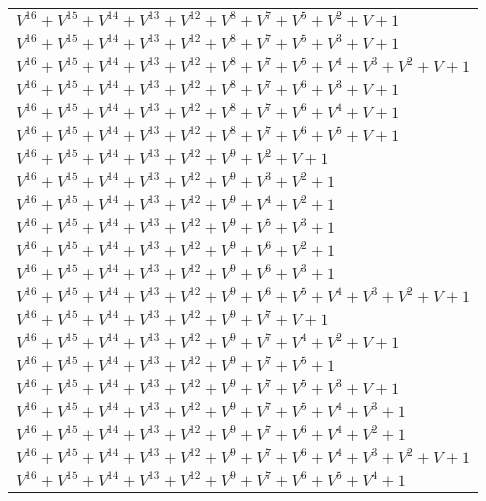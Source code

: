 \documentclass[12pt]{article}
\begin{document}
\begin{adjustwidth}{-4cm}{}
\begin{center}
\begin{longtable}{|l|}
$V^{16}  +V^{15}  +V^{14}  +V^{13}  +V^{12}  +V^{8}  +V^{7}  +V^{5}  +V^{2}  + V + 1$ \\
$V^{16}  +V^{15}  +V^{14}  +V^{13}  +V^{12}  +V^{8}  +V^{7}  +V^{5}  +V^{3}  + V + 1$ \\
$V^{16}  +V^{15}  +V^{14}  +V^{13}  +V^{12}  +V^{8}  +V^{7}  +V^{5}  +V^{4}  +V^{3}  +V^{2}  + V + 1$ \\
$V^{16}  +V^{15}  +V^{14}  +V^{13}  +V^{12}  +V^{8}  +V^{7}  +V^{6}  +V^{3}  + V + 1$ \\
$V^{16}  +V^{15}  +V^{14}  +V^{13}  +V^{12}  +V^{8}  +V^{7}  +V^{6}  +V^{4}  + V + 1$ \\
$V^{16}  +V^{15}  +V^{14}  +V^{13}  +V^{12}  +V^{8}  +V^{7}  +V^{6}  +V^{5}  + V + 1$ \\
$V^{16}  +V^{15}  +V^{14}  +V^{13}  +V^{12}  +V^{9}  +V^{2}  + V + 1$ \\
$V^{16}  +V^{15}  +V^{14}  +V^{13}  +V^{12}  +V^{9}  +V^{3}  +V^{2}  + 1$ \\
$V^{16}  +V^{15}  +V^{14}  +V^{13}  +V^{12}  +V^{9}  +V^{4}  +V^{2}  + 1$ \\
$V^{16}  +V^{15}  +V^{14}  +V^{13}  +V^{12}  +V^{9}  +V^{5}  +V^{3}  + 1$ \\
$V^{16}  +V^{15}  +V^{14}  +V^{13}  +V^{12}  +V^{9}  +V^{6}  +V^{2}  + 1$ \\
$V^{16}  +V^{15}  +V^{14}  +V^{13}  +V^{12}  +V^{9}  +V^{6}  +V^{3}  + 1$ \\
$V^{16}  +V^{15}  +V^{14}  +V^{13}  +V^{12}  +V^{9}  +V^{6}  +V^{5}  +V^{4}  +V^{3}  +V^{2}  + V + 1$ \\
$V^{16}  +V^{15}  +V^{14}  +V^{13}  +V^{12}  +V^{9}  +V^{7}  + V + 1$ \\
$V^{16}  +V^{15}  +V^{14}  +V^{13}  +V^{12}  +V^{9}  +V^{7}  +V^{4}  +V^{2}  + V + 1$ \\
$V^{16}  +V^{15}  +V^{14}  +V^{13}  +V^{12}  +V^{9}  +V^{7}  +V^{5}  + 1$ \\
$V^{16}  +V^{15}  +V^{14}  +V^{13}  +V^{12}  +V^{9}  +V^{7}  +V^{5}  +V^{3}  + V + 1$ \\
$V^{16}  +V^{15}  +V^{14}  +V^{13}  +V^{12}  +V^{9}  +V^{7}  +V^{5}  +V^{4}  +V^{3}  + 1$ \\
$V^{16}  +V^{15}  +V^{14}  +V^{13}  +V^{12}  +V^{9}  +V^{7}  +V^{6}  +V^{4}  +V^{2}  + 1$ \\
$V^{16}  +V^{15}  +V^{14}  +V^{13}  +V^{12}  +V^{9}  +V^{7}  +V^{6}  +V^{4}  +V^{3}  +V^{2}  + V + 1$ \\
$V^{16}  +V^{15}  +V^{14}  +V^{13}  +V^{12}  +V^{9}  +V^{7}  +V^{6}  +V^{5}  +V^{4}  + 1$ \\

\end{longtable}
\end{center}
\end{adjustwidth}
\end{document}
